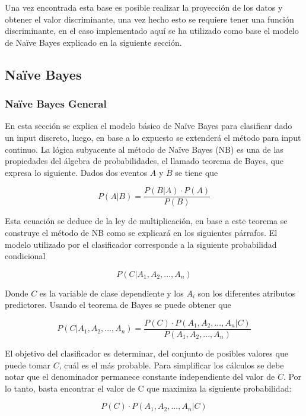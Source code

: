 \documentclass[letter, titlepage, 10pt]{article}
\begin{document}
Una vez encontrada esta base es posible realizar la proyección de los datos y obtener el valor discriminante, una vez hecho esto se requiere tener una función discriminante, en el caso implementado aquí se ha utilizado como base el modelo de Naïve Bayes explicado en la siguiente sección.


\subsection{Naïve Bayes}
	\subsubsection{Naïve Bayes General}
	En esta sección se explica el modelo básico de Naïve Bayes para clasificar dado un input discreto, luego, en base a lo expuesto se extenderá el método para input continuo.
	La lógica subyacente al método de Naïve Bayes (NB) es una de las propiedades del álgebra de probabilidades, el llamado teorema de Bayes, que expresa lo siguiente. Dados dos eventos $A$ y $B$ se tiene que

\begin{equation}
P(A|B) = \frac{P(B|A)\cdot P(A)}{P(B)}
\end{equation}

Esta ecuación se deduce de la ley de multiplicación, en base a este teorema se construye el método de NB como se explicará en los siguientes párrafos. 
El modelo utilizado por el clasificador corresponde a la siguiente probabilidad condicional

\begin{equation}
P(C|A_1,A_2,...,A_n)
\end{equation}

Donde $C$ es la variable de clase dependiente y los $A_i$ son los diferentes atributos predictores. Usando el teorema de Bayes se puede obtener que 

\begin{equation}
P(C|A_1,A_2,...,A_n) = \frac{P(C)\cdot P(A_1,A_2,...,A_n|C)}{P(A_1,A_2,...,A_n)}
\end{equation}

El objetivo del clasificador es determinar, del conjunto de posibles valores que puede tomar $C$, cuál es el más probable. Para simplificar los cálculos se debe notar que el denominador permanece constante independiente del valor de $C$. Por lo tanto, basta encontrar el valor de C que maximiza la siguiente probabilidad:

\begin{equation}
P(C)\cdot P(A_1,A_2,...,A_n|C)
\end{equation}
\end{document}
